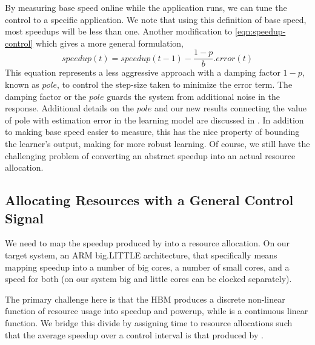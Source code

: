 By measuring
base speed online while the application runs, we can tune the control
to a specific application.  We note that using this definition of base
speed, most speedups will be less than one.  Another modification to \eqref{eqn:speedup-control} which gives a more general formulation,
\begin{equation}
speedup(t) = speedup(t-1) - \frac{1 - p}{b}.error(t)
\end{equation}
This equation represents a less aggressive approach with a damping factor $1-p$, known as $pole$, to control the step-size taken to minimize the error term. The damping factor or the $pole$ guards the system from additional noise in the response. Additional details on the $pole$ and our new results connecting the value of pole with estimation error in the learning model are discussed in \secref{}. In addition to making
base speed easier to measure, this has the nice property of bounding
the learner's output, making for more robust learning. Of course, we still have the challenging problem of converting an
abstract speedup into an actual resource allocation.


\subsection{Allocating Resources with a General Control Signal}
We need to map the speedup produced by  into a
resource allocation.  On our target system, an ARM big.LITTLE
architecture, that specifically means mapping speedup into a number of
big cores, a number of small cores, and a speed for both (on our
system big and little cores can be clocked separately).

The primary challenge here is that the HBM produces a discrete
non-linear function of resource usage into speedup and powerup, while
 is a continuous linear function.  We bridge
this divide by assigning time to resource allocations such that the
average speedup over a control interval is that produced by
.

